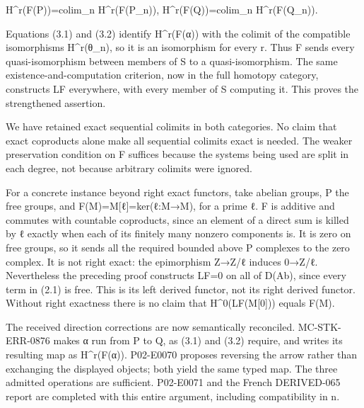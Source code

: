 \documentclass[11pt]{article}
\begin{document}
H\textasciicircum{}r(F(P)\allowbreak{})\allowbreak{}\allowbreak{}=colim\_\allowbreak{}n H\textasciicircum{}r(F(P\_\allowbreak{}n)\allowbreak{})\allowbreak{},\allowbreak{} H\textasciicircum{}r(F(Q)\allowbreak{})\allowbreak{}\allowbreak{}=colim\_\allowbreak{}n H\textasciicircum{}r(F(Q\_\allowbreak{}n)\allowbreak{})\allowbreak{}.

Equations (3.1)\allowbreak{} and (3.2)\allowbreak{} identify H\textasciicircum{}r(F(α)\allowbreak{})\allowbreak{} with the colimit of the compatible isomorphisms H\textasciicircum{}r(θ\_\allowbreak{}n)\allowbreak{},\allowbreak{} so it is an isomorphism for every r. Thus F sends every quasi-isomorphism between members of S to a quasi-isomorphism. The same existence-and-computation criterion,\allowbreak{} now in the full homotopy category,\allowbreak{} constructs LF everywhere,\allowbreak{} with every member of S computing it. This proves the strengthened assertion.

We have retained exact sequential colimits in both categories. No claim that exact coproducts alone make all sequential colimits exact is needed. The weaker preservation condition on F suffices because the systems being used are split in each degree,\allowbreak{} not because arbitrary colimits were ignored.

For a concrete instance beyond right exact functors,\allowbreak{} take abelian groups,\allowbreak{} P the free groups,\allowbreak{} and F(M)\allowbreak{}\allowbreak{}=M[ℓ]\allowbreak{}\allowbreak{}=ker(ℓ:\allowbreak{}M\allowbreak{}→M)\allowbreak{},\allowbreak{} for a prime ℓ. F is additive and commutes with countable coproducts,\allowbreak{} since an element of a direct sum is killed by ℓ exactly when each of its finitely many nonzero components is. It is zero on free groups,\allowbreak{} so it sends all the required bounded above P complexes to the zero complex. It is not right exact:\allowbreak{} the epimorphism Z\allowbreak{}→Z/\allowbreak{}ℓ induces 0\allowbreak{}→Z/\allowbreak{}ℓ. Nevertheless the preceding proof constructs LF\allowbreak{}=0 on all of D(Ab)\allowbreak{},\allowbreak{} since every term in (2.1)\allowbreak{} is free. This is its left derived functor,\allowbreak{} not its right derived functor. Without right exactness there is no claim that H\textasciicircum{}0(LF(M[0]\allowbreak{})\allowbreak{})\allowbreak{} equals F(M)\allowbreak{}.

The received direction corrections are now semantically reconciled. MC-STK-ERR-0876 makes α run from P to Q,\allowbreak{} as (3.1)\allowbreak{} and (3.2)\allowbreak{} require,\allowbreak{} and writes its resulting map as H\textasciicircum{}r(F(α)\allowbreak{})\allowbreak{}. P02-E0070 proposes reversing the arrow rather than exchanging the displayed objects; both yield the same typed map. The three admitted operations are sufficient. P02-E0071 and the French DERIVED-065 report are completed with this entire argument,\allowbreak{} including compatibility in n.
\end{document}
